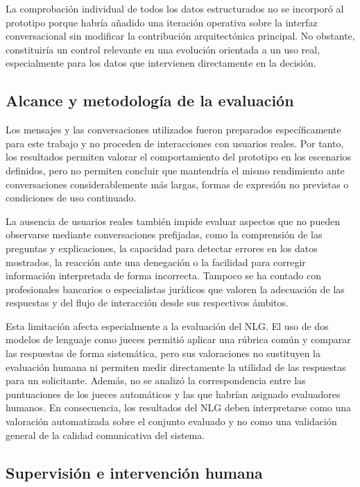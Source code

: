 \documentclass[12pt,a4paper]{report}
\begin{document}
La comprobación individual de todos los datos estructurados no se incorporó al prototipo porque habría añadido una iteración operativa sobre la interfaz conversacional sin modificar la contribución arquitectónica principal. No obstante, constituiría un control relevante en una evolución orientada a un uso real, especialmente para los datos que intervienen directamente en la decisión.

\subsection{Alcance y metodología de la evaluación}

Los mensajes y las conversaciones utilizados fueron preparados específicamente para este trabajo y no proceden de interacciones con usuarios reales. Por tanto, los resultados permiten valorar el comportamiento del prototipo en los escenarios definidos, pero no permiten concluir que mantendría el mismo rendimiento ante conversaciones considerablemente más largas, formas de expresión no previstas o condiciones de uso continuado.

La ausencia de usuarios reales también impide evaluar aspectos que no pueden observarse mediante conversaciones prefijadas, como la comprensión de las preguntas y explicaciones, la capacidad para detectar errores en los datos mostrados, la reacción ante una denegación o la facilidad para corregir información interpretada de forma incorrecta. Tampoco se ha contado con profesionales bancarios o especialistas jurídicos que valoren la adecuación de las respuestas y del flujo de interacción desde sus respectivos ámbitos.

Esta limitación afecta especialmente a la evaluación del NLG. El uso de dos modelos de lenguaje como jueces permitió aplicar una rúbrica común y comparar las respuestas de forma sistemática, pero sus valoraciones no sustituyen la evaluación humana ni permiten medir directamente la utilidad de las respuestas para un solicitante. Además, no se analizó la correspondencia entre las puntuaciones de los jueces automáticos y las que habrían asignado evaluadores humanos. En consecuencia, los resultados del NLG deben interpretarse como una valoración automatizada sobre el conjunto evaluado y no como una validación general de la calidad comunicativa del sistema.

\subsection{Supervisión e intervención humana}
\end{document}
